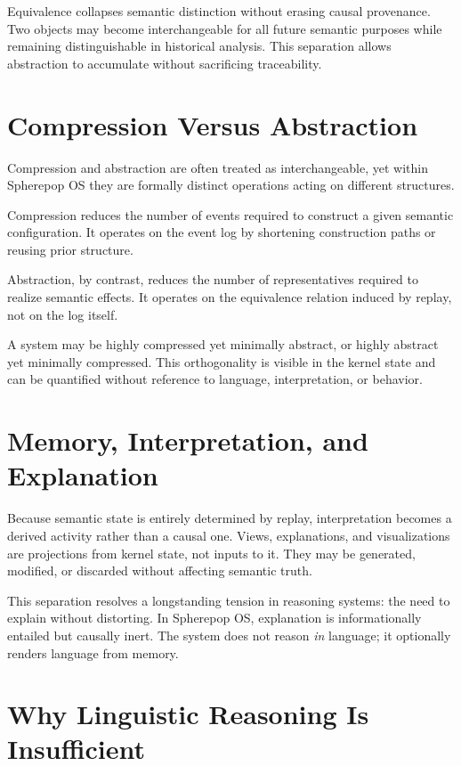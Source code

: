 Equivalence collapses semantic distinction without erasing causal provenance. Two objects may become interchangeable for all future semantic purposes while remaining distinguishable in historical analysis. This separation allows abstraction to accumulate without sacrificing traceability.

\section{Compression Versus Abstraction}

Compression and abstraction are often treated as interchangeable, yet within Spherepop OS they are formally distinct operations acting on different structures.

Compression reduces the number of events required to construct a given semantic configuration. It operates on the event log by shortening construction paths or reusing prior structure.

Abstraction, by contrast, reduces the number of representatives required to realize semantic effects. It operates on the equivalence relation induced by replay, not on the log itself.

A system may be highly compressed yet minimally abstract, or highly abstract yet minimally compressed. This orthogonality is visible in the kernel state and can be quantified without reference to language, interpretation, or behavior.

\section{Memory, Interpretation, and Explanation}

Because semantic state is entirely determined by replay, interpretation becomes a derived activity rather than a causal one. Views, explanations, and visualizations are projections from kernel state, not inputs to it. They may be generated, modified, or discarded without affecting semantic truth.

This separation resolves a longstanding tension in reasoning systems: the need to explain without distorting. In Spherepop OS, explanation is informationally entailed but causally inert. The system does not reason \emph{in} language; it optionally renders language from memory.

\section{Why Linguistic Reasoning Is Insufficient}

